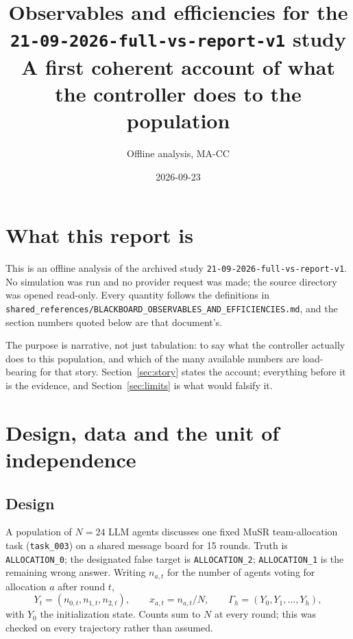 \documentclass[11pt]{article}
\title{Observables and efficiencies for the \texttt{21-09-2026-full-vs-report-v1} study\\
\large A first coherent account of what the controller does to the population}
\author{Offline analysis, MA-CC}
\date{2026-09-23}
\begin{document}
\maketitle
\tableofcontents
\clearpage

\section{What this report is}
This is an offline analysis of the archived study \texttt{21-09-2026-full-vs-report-v1}.
No simulation was run and no provider request was made; the source directory was opened
read-only. Every quantity follows the definitions in
\texttt{shared\_references/BLACKBOARD\_OBSERVABLES\_AND\_EFFICIENCIES.md}, and the section
numbers quoted below are that document's.

The purpose is narrative, not just tabulation: to say what the controller actually does to
this population, and which of the many available numbers are load-bearing for that story.
Section~\ref{sec:story} states the account; everything before it is the evidence, and
Section~\ref{sec:limits} is what would falsify it.

\section{Design, data and the unit of independence}
\subsection{Design}
A population of $N=24$ LLM agents discusses one fixed MuSR team-allocation task
(\texttt{task\_003}) on a shared message board for 15 rounds. Truth is
\texttt{ALLOCATION\_0}; the designated false target is \texttt{ALLOCATION\_2};
\texttt{ALLOCATION\_1} is the remaining wrong answer. Writing $n_{a,t}$ for the number of
agents voting for allocation $a$ after round $t$,
\begin{equation}
Y_t=(n_{0,t},n_{1,t},n_{2,t}),\qquad x_{a,t}=n_{a,t}/N,\qquad
\Gamma_h=(Y_0,Y_1,\dots,Y_h),
\end{equation}
with $Y_0$ the initialization state. Counts sum to $N$ at every round; this was checked on
every trajectory rather than assumed.
\end{document}
